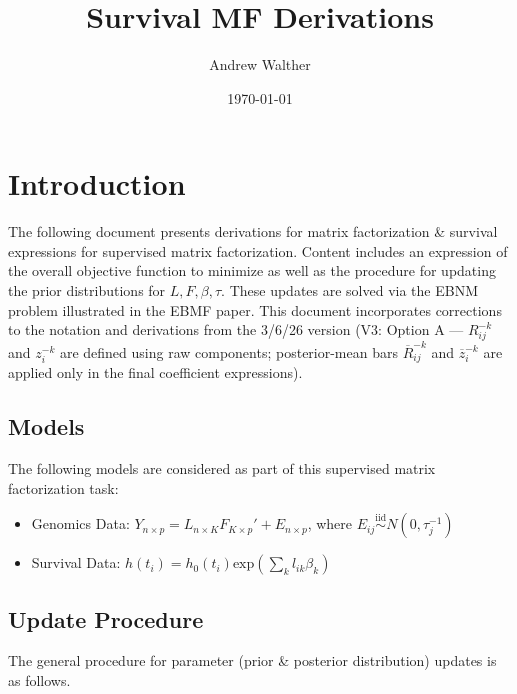 \documentclass{article}[12pt]
\begin{document}
\title{Survival MF Derivations}
\author{Andrew Walther}
\date{\today}
\maketitle
\tableofcontents
\newpage

\section{Introduction}

The following document presents derivations for matrix factorization \& survival
expressions for supervised matrix factorization. Content includes an expression
of the overall objective function to minimize as well as the procedure for
updating the prior distributions for $L, F, \beta, \tau$. These updates are
solved via the EBNM problem illustrated in the EBMF paper. This document
incorporates corrections to the notation and derivations from the
3/6/26 version (V3: Option A --- $R^{-k}_{ij}$ and $z^{-k}_i$ are defined
using raw components; posterior-mean bars $\overline{R}^{-k}_{ij}$ and
$\overline{z}^{-k}_i$ are applied only in the final coefficient expressions).

\subsection{Models}

The following models are considered as part of this supervised matrix
factorization task:

\begin{itemize}
    \item Genomics Data: $Y_{n \times p} = L_{n\times K}F_{K\times p}' + E_{n\times p}$, where $E_{ij} \overset{\mathrm{iid}}{\sim} N\left(0, \tau_{j}^{-1}\right)$

    \item Survival Data: $h(t_i) = h_0(t_i)\text{exp}\left(\sum_k l_{ik}\beta_{k}\right)$
\end{itemize}

\subsection{Update Procedure}

The general procedure for parameter (prior \& posterior distribution) updates is as follows.
\end{document}
